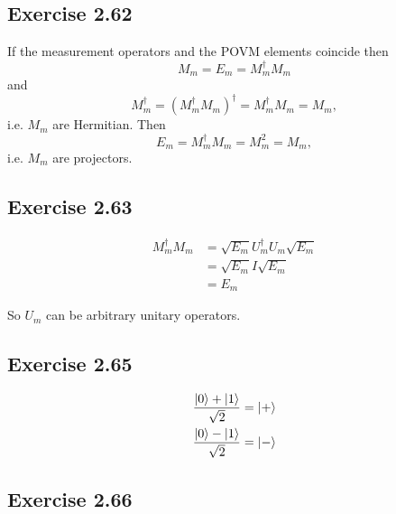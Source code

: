 \documentclass{article}
\begin{document}
\subsection*{Exercise 2.62}

If the measurement operators and the POVM elements coincide then \[M_m = E_m = M_m^\dagger M_m\] and \[M_m^\dagger = (M_m^\dagger M_m)^\dagger = M_m^\dagger M_m = M_m,\] i.e. $M_m$ are Hermitian. Then \[E_m = M_m^\dagger M_m = M_m^2 = M_m,\] i.e. $M_m$ are projectors.

\subsection*{Exercise 2.63}

\begin{align*}
  M_m^\dagger M_m & = \sqrt{E_m} U_m^\dagger U_m \sqrt{E_m} \\
                  & = \sqrt{E_m} I \sqrt{E_m}               \\
                  & = E_m
\end{align*}

So $U_m$ can be arbitrary unitary operators.

\subsection*{Exercise 2.65}

\begin{align*}
  \frac{\ket{0} + \ket{1}}{\sqrt{2}} & = \ket{+} \\
  \frac{\ket{0} - \ket{1}}{\sqrt{2}} & = \ket{-}
\end{align*}

\subsection*{Exercise 2.66}
\end{document}
